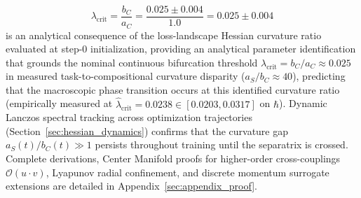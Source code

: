 \documentclass{article}
\theoremstyle{plain}
\theoremstyle{definition}
\begin{document}
\begin{equation}
    \lambda_{\text{crit}} = \frac{b_C}{a_C} = \frac{0.025 \pm 0.004}{1.0} = 0.025 \pm 0.004
    \label{eq:lambda_crit_analytical}
\end{equation}
is an analytical consequence of the loss-landscape Hessian curvature ratio evaluated at step-0 initialization, providing an analytical parameter identification that grounds the nominal continuous bifurcation threshold $\lambda_{\text{crit}} = b_C / a_C \approx 0.025$ in measured task-to-compositional curvature disparity ($a_S / b_C \approx 40$), predicting that the macroscopic phase transition occurs at this identified curvature ratio (empirically measured at $\hat{\lambda}_{\text{crit}} = 0.0238 \in [0.0203, 0.0317]$ on $\hbar$). Dynamic Lanczos spectral tracking across optimization trajectories (Section~\ref{sec:hessian_dynamics}) confirms that the curvature gap $a_S(t) / b_C(t) \gg 1$ persists throughout training until the separatrix is crossed. Complete derivations, Center Manifold proofs for higher-order cross-couplings $\mathcal{O}(u \cdot v)$, Lyapunov radial confinement, and discrete momentum surrogate extensions are detailed in Appendix~\ref{sec:appendix_proof}.
\end{document}
